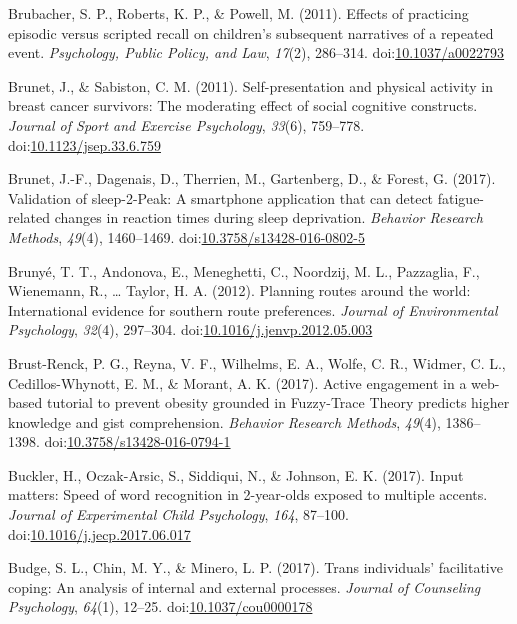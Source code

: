 \documentclass[english,man]{apa6}
\theoremstyle{definition}
\theoremstyle{definition}
\theoremstyle{definition}
\theoremstyle{remark}
\begin{document}
\hypertarget{ref-Brubacher2011}{}
Brubacher, S. P., Roberts, K. P., \& Powell, M. (2011). Effects of
practicing episodic versus scripted recall on children's subsequent
narratives of a repeated event. \emph{Psychology, Public Policy, and
Law}, \emph{17}(2), 286--314.
doi:\href{https://doi.org/10.1037/a0022793}{10.1037/a0022793}

\hypertarget{ref-Brunet2011}{}
Brunet, J., \& Sabiston, C. M. (2011). Self-presentation and physical
activity in breast cancer survivors: The moderating effect of social
cognitive constructs. \emph{Journal of Sport and Exercise Psychology},
\emph{33}(6), 759--778.
doi:\href{https://doi.org/10.1123/jsep.33.6.759}{10.1123/jsep.33.6.759}

\hypertarget{ref-Brunet2016}{}
Brunet, J.-F., Dagenais, D., Therrien, M., Gartenberg, D., \& Forest, G.
(2017). Validation of sleep-2-Peak: A smartphone application that can
detect fatigue-related changes in reaction times during sleep
deprivation. \emph{Behavior Research Methods}, \emph{49}(4), 1460--1469.
doi:\href{https://doi.org/10.3758/s13428-016-0802-5}{10.3758/s13428-016-0802-5}

\hypertarget{ref-Brunye2012}{}
Brunyé, T. T., Andonova, E., Meneghetti, C., Noordzij, M. L., Pazzaglia,
F., Wienemann, R., \ldots{} Taylor, H. A. (2012). Planning routes around
the world: International evidence for southern route preferences.
\emph{Journal of Environmental Psychology}, \emph{32}(4), 297--304.
doi:\href{https://doi.org/10.1016/j.jenvp.2012.05.003}{10.1016/j.jenvp.2012.05.003}

\hypertarget{ref-Brust-Renck2016}{}
Brust-Renck, P. G., Reyna, V. F., Wilhelms, E. A., Wolfe, C. R., Widmer,
C. L., Cedillos-Whynott, E. M., \& Morant, A. K. (2017). Active
engagement in a web-based tutorial to prevent obesity grounded in
Fuzzy-Trace Theory predicts higher knowledge and gist comprehension.
\emph{Behavior Research Methods}, \emph{49}(4), 1386--1398.
doi:\href{https://doi.org/10.3758/s13428-016-0794-1}{10.3758/s13428-016-0794-1}

\hypertarget{ref-Buckler2017}{}
Buckler, H., Oczak-Arsic, S., Siddiqui, N., \& Johnson, E. K. (2017).
Input matters: Speed of word recognition in 2-year-olds exposed to
multiple accents. \emph{Journal of Experimental Child Psychology},
\emph{164}, 87--100.
doi:\href{https://doi.org/10.1016/j.jecp.2017.06.017}{10.1016/j.jecp.2017.06.017}

\hypertarget{ref-Budge2017}{}
Budge, S. L., Chin, M. Y., \& Minero, L. P. (2017). Trans individuals'
facilitative coping: An analysis of internal and external processes.
\emph{Journal of Counseling Psychology}, \emph{64}(1), 12--25.
doi:\href{https://doi.org/10.1037/cou0000178}{10.1037/cou0000178}
\end{document}
